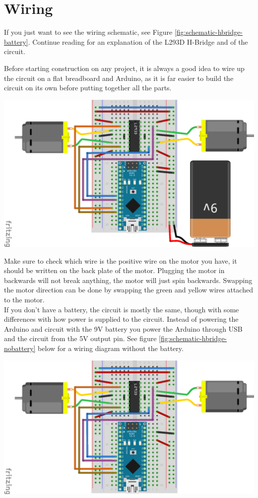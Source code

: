 \documentclass[../TinyBot.tex]{subfiles}
\begin{document}
\section{Wiring} \label{wiring}
If you just want to see the wiring schematic, see Figure \ref{fig:schematic-hbridge-battery}.
Continue reading for an explanation of the L293D H-Bridge and of the circuit. 

\bigskip

Before starting construction on any project, it is always a good idea to wire up the circuit
on a flat breadboard and Arduino, as it is far easier to build the circuit on its own before
putting together all the parts. \\

\begin{center}
    \includegraphics[width=\textwidth]{resources/H-bridge-nano_bb.png}
    \label{fig:schematic-hbridge-battery}
\end{center}

Make sure to check which wire is the positive wire on the motor you have, it should be written
on the back plate of the motor. Plugging the motor in backwards will not break anything,
the motor will just spin backwards. Swapping the motor direction can be done by swapping
the green and yellow wires attached to the motor. \\

If you don't have a battery, the circuit is mostly the same, though with some differences
with how power is supplied to the circuit. Instead of powering the Arduino and circuit
with the 9V battery you power the Arduino through USB and the circuit from the 5V output pin.
See figure \ref{fig:schematic-hbridge-nobattery} below for a wiring diagram without the battery.

\begin{center}
    \includegraphics[width=\textwidth]{resources/H-bridge-nano-without-battery_bb.png}
    \label{fig:schematic-hbridge-nobattery}
\end{center}
\end{document}
